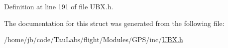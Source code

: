 \-Definition at line 191 of file \-U\-B\-X.\-h.



\-The documentation for this struct was generated from the following file\-:\begin{DoxyCompactItemize}
\item 
/home/jb/code/\-Tau\-Labs/flight/\-Modules/\-G\-P\-S/inc/\hyperlink{_u_b_x_8h}{\-U\-B\-X.\-h}\end{DoxyCompactItemize}
